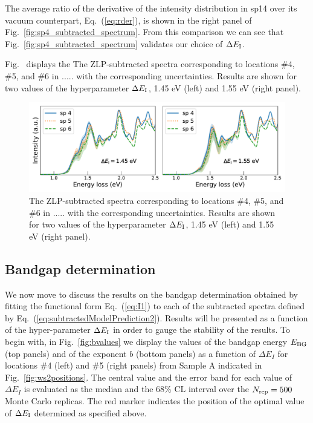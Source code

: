 The average ratio of the derivative of the intensity
distribution in sp14 over its vacuum counterpart, Eq.~(\ref{eq:rder}), is shown
in the right panel of  Fig.~\ref{fig:sp4_subtracted_spectrum}. 
%
From this comparison we can see that Fig.~\ref{fig:sp4_subtracted_spectrum} validates our choice of
$\Delta E_{\rm I}$.

Fig.~\label{fig:subtracted_spectra_comp} displays the
The ZLP-subtracted spectra corresponding to locations \#4, \#5, and \#6
    in ..... with the corresponding uncertainties.
    Results are shown for two values of the hyperparameter $\Delta E_{\rm I}$,
    1.45 eV (left) and 1.55 eV (right panel).

\begin{figure}[t]
\begin{centering}
  \includegraphics[width=0.99\linewidth]{plots/subtracted_spectra_comp.pdf}
  \caption{The ZLP-subtracted spectra corresponding to locations \#4, \#5, and \#6
    in ..... with the corresponding uncertainties.
    Results are shown for two values of the hyperparameter $\Delta E_{\rm I}$,
    1.45 eV (left) and 1.55 eV (right panel).
  }
\label{fig:subtracted_spectra_comp}
\end{centering}
\end{figure}

\subsection{Bandgap determination}



We now move to discuss the results on the bandgap determination obtained
by fitting the functional form Eq.~(\ref{eq:I1}) to each of the subtracted
spectra defined by Eq.~(\ref{eq:subtractedModelPrediction2}).
%
Results will be presented as a function of the hyper-parameter $\Delta E_{\rm I}$
in order to gauge the stability of the results.
%
To begin with, in Fig.~\ref{fig:bvalues}
we display the values of the bandgap energy $E_{\rm BG}$ (top panels)
and of the exponent $b$ (bottom panels) as a function of $\Delta E_I$
for locations \#4 (left)
and \#5 (right panels) from Sample A indicated in Fig.~\ref{fig:ws2positions}.
%
The central value and the error band for each value of $\Delta E_I$ is evaluated
as the median and the 68\% CL interval over the $N_{\rm rep}=500$ Monte Carlo replicas.
%
The red marker indicates the position of the optimal value of
$\Delta E_{\rm I}$ determined as specified above.

